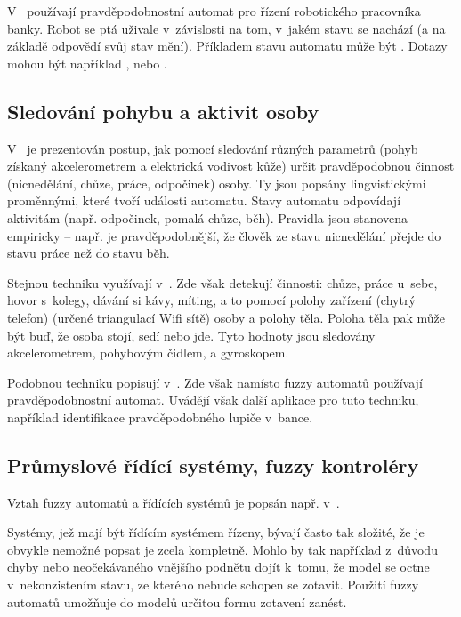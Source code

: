 V~\cite{SchYou-ProSimHumMacDia} používají pravděpodobnostní automat pro řízení robotického pracovníka banky. Robot se ptá uživale v~závislosti na tom, v~jakém stavu se nachází (a na základě odpovědí svůj stav mění). Příkladem stavu automatu může být . Dotazy mohou být například ,  nebo .


\subsection{Sledování pohybu a aktivit osoby}
V~\cite{TriHei-LinSumHumActSkiConAcc} je prezentován postup, jak pomocí sledování různých parametrů (pohyb získaný akcelerometrem a elektrická vodivost kůže) určit pravděpodobnou činnost (nicnedělání, chůze, práce, odpočinek) osoby. Ty jsou popsány lingvistickými proměnnými, které tvoří události automatu. Stavy automatu odpovídají aktivitám (např. odpočinek, pomalá chůze, běh). Pravidla jsou stanovena empiricky -- např. je pravděpodobnější, že člověk ze stavu nicnedělání přejde do stavu práce než do stavu běh.

Stejnou techniku využívají v~\cite{Alv+-HumActRec+}. Zde však detekují činnosti: chůze, práce u~sebe, hovor s~kolegy, dávání si kávy, míting, a to pomocí polohy zařízení (chytrý telefon) (určené triangulací Wifi sítě) osoby a polohy těla. Poloha těla pak může být buď, že osoba stojí, sedí nebo jde. Tyto hodnoty jsou sledovány akcelerometrem, pohybovým čidlem, a gyroskopem. 

Podobnou techniku popisují v~\cite{TurChe-MacRecHumActSur}. Zde však namísto fuzzy automatů používají pravděpodobnostní automat. Uvádějí však další aplikace pro tuto techniku, například identifikace pravděpodobného lupiče v~bance.

\subsection{Průmyslové řídící systémy, fuzzy kontroléry}
Vztah fuzzy automatů a řídících systémů je popsán např. v~\cite{HeKinSep-DecMakFuzEnvZUsOntCon+, Gra+-ApFuStFuOuFinMaPrRecVioOntAss, WeeFu-FormFuzAutAppModLeaSys, GraFodDri-HybFuzBooAutOntCont}. 

Systémy, jež mají být řídícím systémem řízeny, bývají často tak složité, že je obvykle nemožné popsat je zcela kompletně. Mohlo by tak například z~důvodu chyby nebo neočekávaného vnějšího podnětu dojít k~tomu, že model se octne v~nekonzistením stavu, ze kterého nebude schopen se zotavit. Použití fuzzy automatů umožňuje do modelů určitou formu zotavení zanést.

